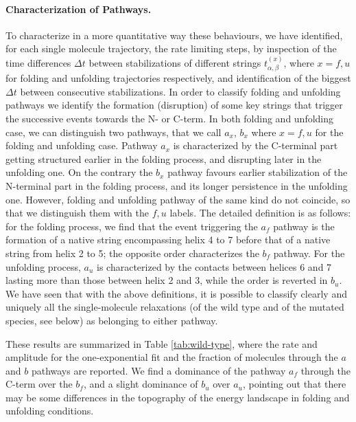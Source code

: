 \paragraph{Characterization of Pathways.}
To characterize in a more quantitative way these behaviours, we have identified,
for each single molecule trajectory, the rate limiting steps, by inspection of
the time differences $\Delta t$ between stabilizations of different strings
$t_{\alpha,\beta}^{(x)}$, where $x=f,u$ for folding and unfolding trajectories
respectively, and
identification of the biggest $\Delta t$ between consecutive stabilizations. 
In order to classify folding and unfolding pathways we identify the
formation (disruption) of some key strings that trigger the successive events
towards the N- or C-term.
In both folding and unfolding case, we can distinguish two pathways, that we
call $a_x$, $b_x$ where $x=f,u$ for the folding and unfolding case. Pathway
$a_x$ is characterized by the C-terminal part getting structured earlier in the
folding process, and disrupting later in the unfolding one.  On the contrary the
$b_x$ pathway favours earlier stabilization of the N-terminal part in the
folding process, and its longer persistence in the unfolding one.
However, folding and unfolding pathway of the same kind do not coincide, so that
we distinguish them with the $f,u$ labels. The detailed definition is as
follows: for the folding process, we find that the event triggering the $a_f$
pathway is the formation of a native string encompassing helix 4 to 7 before
that of a native string from helix 2 to 5; the opposite order characterizes the
$b_f$ pathway.
For the unfolding process,  $a_u$ is characterized by the contacts between
helices 6 and 7 lasting more than those between helix 2 and 3, while the order
is reverted in $b_u$.
We have seen that with the above definitions, it is possible to classify clearly
and uniquely  all the single-molecule relaxations (of the wild type and of the
mutated species, see below) as belonging to either pathway.

These results are summarized in Table \ref{tab:wild-type}, where the rate and
amplitude for the one-exponential fit and the fraction of molecules through the
$a$ and $b$ pathways are reported.
We find a dominance of the pathway $a_f$ through the C-term over the $b_f$, and
a slight dominance of  $b_u$ over $a_u$, pointing out that there may be some
differences in the topography of the energy landscape in folding and unfolding
conditions.

